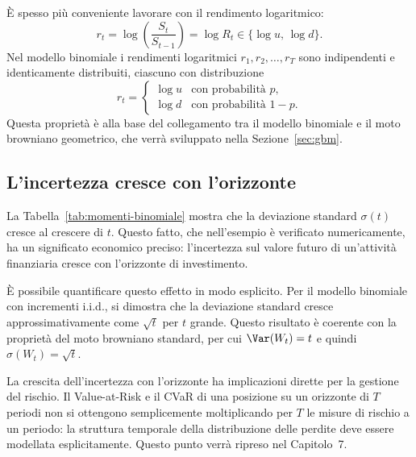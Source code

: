\`{E} spesso pi\`{u} conveniente lavorare con il rendimento
logaritmico:
\[
r_t=\log\!\left(\frac{S_t}{S_{t-1}}\right)=\log R_t
\in\{\log u,\,\log d\}.
\]
Nel modello binomiale i rendimenti logaritmici $r_1,r_2,\ldots,r_T$
sono indipendenti e identicamente distribuiti, ciascuno con
distribuzione
\[
r_t=\begin{cases}
\log u & \text{con probabilit\`{a} }p,\\
\log d & \text{con probabilit\`{a} }1-p.
\end{cases}
\]
Questa propriet\`{a} \`{e} alla base del collegamento tra il modello
binomiale e il moto browniano geometrico, che verr\`{a} sviluppato
nella Sezione~\ref{sec:gbm}.

\subsection{L'incertezza cresce con l'orizzonte}

La Tabella~\ref{tab:momenti-binomiale} mostra che la deviazione
standard $\sigma(t)$ cresce al crescere di $t$. Questo fatto, che
nell'esempio \`{e} verificato numericamente, ha un significato
economico preciso: l'incertezza sul valore futuro di un'attivit\`{a}
finanziaria cresce con l'orizzonte di investimento.

\`{E} possibile quantificare questo effetto in modo esplicito. Per
il modello binomiale con incrementi i.i.d., si dimostra che la
deviazione standard cresce approssimativamente come $\sqrt{t}$ per
$t$ grande. Questo risultato \`{e} coerente con la propriet\`{a}
del moto browniano standard, per cui $\Var(W_t)=t$ e quindi
$\sigma(W_t)=\sqrt{t}$.

\begin{remark}
La crescita dell'incertezza con l'orizzonte ha implicazioni dirette
per la gestione del rischio. Il Value-at-Risk e il CVaR di una
posizione su un orizzonte di $T$ periodi non si ottengono
semplicemente moltiplicando per $T$ le misure di rischio a un
periodo: la struttura temporale della distribuzione delle perdite
deve essere modellata esplicitamente. Questo punto verr\`{a}
ripreso nel Capitolo~7.
\end{remark}
